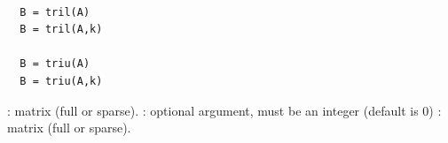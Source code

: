 \begin{mandesc}
  \\
\end{mandesc}
\begin{calling_sequence}
\begin{verbatim}
  B = tril(A)
  B = tril(A,k)
  
  B = triu(A)
  B = triu(A,k)
\end{verbatim}
\end{calling_sequence}
\begin{parameters}
  \begin{varlist}
     : matrix (full or sparse).
     : optional argument, must be an integer (default is $0$)
     : matrix (full or sparse).
  \end{varlist}
\end{parameters}
